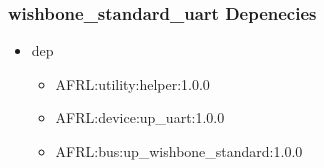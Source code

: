 \subsubsection{wishbone\_standard\_uart Depenecies}
\begin{itemize}
\item dep
	\begin{itemize}
	\item AFRL:utility:helper:1.0.0
	\item AFRL:device:up\_uart:1.0.0
	\item AFRL:bus:up\_wishbone\_standard:1.0.0
	\end{itemize}
\end{itemize}
